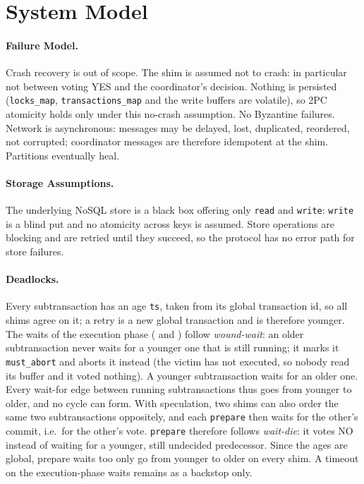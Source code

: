 \documentclass{article}
\begin{document}
\section*{System Model}

\paragraph{Failure Model.}
Crash recovery is out of scope. The shim is assumed not to crash: in particular not between voting YES and the coordinator's decision. Nothing is persisted (\texttt{locks\_map}, \texttt{transactions\_map} and the write buffers are volatile), so 2PC atomicity holds only under this no-crash assumption. No Byzantine failures. Network is asynchronous: messages may be delayed, lost, duplicated, reordered, not corrupted; coordinator messages are therefore idempotent at the shim. Partitions eventually heal.

\paragraph{Storage Assumptions.}
The underlying NoSQL store is a black box offering only \texttt{read} and \texttt{write}: \texttt{write} is a blind put and no atomicity across keys is assumed. Store operations are blocking and are retried until they succeed, so the protocol has no error path for store failures.

\paragraph{Deadlocks.}
Every subtransaction has an age \texttt{ts}, taken from its global transaction id, so all shims agree on it; a retry is a new global transaction and is therefore younger. The waits of the execution phase ( and ) follow \emph{wound-wait}: an older subtransaction never waits for a younger one that is still running; it marks it \texttt{must\_abort} and aborts it instead (the victim has not executed, so nobody read its buffer and it voted nothing). A younger subtransaction waits for an older one. Every wait-for edge between running subtransactions thus goes from younger to older, and no cycle can form. With speculation, two shims can also order the same two subtransactions oppositely, and each \texttt{prepare} then waits for the other's commit, i.e.\ for the other's vote. \texttt{prepare} therefore follows \emph{wait-die}: it votes NO instead of waiting for a younger, still undecided predecessor. Since the ages are global, prepare waits too only go from younger to older on every shim. A timeout on the execution-phase waits remains as a backstop only.
\end{document}
